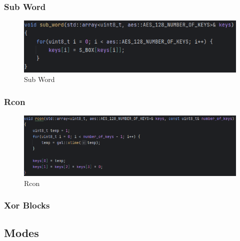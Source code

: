 \textsf{\small } %

\subsubsection{Sub Word}

\begin{figure}[H]
	\centering
	\includegraphics[width=1\textwidth, height=1\textheight, keepaspectratio]{./images/code/cpp/key_expansion/sub_word.PNG}
	\caption{Sub Word}
	\label{fig:sub_word}
\end{figure}

\textsf{\small } %

\subsubsection{Rcon}

\begin{figure}[H]
	\centering
	\includegraphics[width=1\textwidth, height=1\textheight, keepaspectratio]{./images/code/cpp/key_expansion/rcon.PNG}
	\caption{Rcon}
	\label{fig:rcon}
\end{figure}

\textsf{\small } %

\subsubsection{Xor Blocks} %


\subsection{Modes}

\textsf{\small } %

